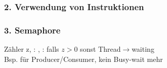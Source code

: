 \subsubsection{2. Verwendung von Instruktionen}
\subsubsection{3. Semaphore}
Zähler z, : , :  falls $z>0$ sonst Thread$\rightarrow$waiting\\
Bsp. für Producer/Consumer, kein Busy-wait mehr

